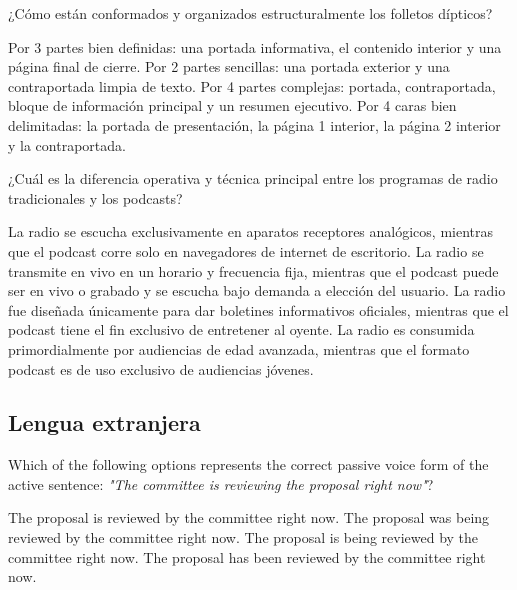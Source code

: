\documentclass[12pt]{evaluasep}
\begin{document}
\begin{questions}
    \question ¿Cómo están conformados y organizados estructuralmente los folletos dípticos?
    \begin{choices}
        \choice Por 3 partes bien definidas: una portada informativa, el contenido interior y una página final de cierre.
        \choice Por 2 partes sencillas: una portada exterior y una contraportada limpia de texto.
        \choice Por 4 partes complejas: portada, contraportada, bloque de información principal y un resumen ejecutivo.
        \CorrectChoice Por 4 caras bien delimitadas: la portada de presentación, la página 1 interior, la página 2 interior y la contraportada.
    \end{choices}
    \vspace{0.3cm}

    \question ¿Cuál es la diferencia operativa y técnica principal entre los programas de radio tradicionales y los podcasts?
    \begin{choices}
        \choice La radio se escucha exclusivamente en aparatos receptores analógicos, mientras que el podcast corre solo en navegadores de internet de escritorio.
        \CorrectChoice La radio se transmite en vivo en un horario y frecuencia fija, mientras que el podcast puede ser en vivo o grabado y se escucha bajo demanda a elección del usuario.
        \choice La radio fue diseñada únicamente para dar boletines informativos oficiales, mientras que el podcast tiene el fin exclusivo de entretener al oyente.
        \choice La radio es consumida primordialmente por audiencias de edad avanzada, mientras que el formato podcast es de uso exclusivo de audiencias jóvenes.
    \end{choices}
    				    \subsection{Lengua extranjera}

\question Which of the following options represents the correct passive voice form of the active sentence: \textit{"The committee is reviewing the proposal right now"}?
    \begin{choices}
        \choice The proposal is reviewed by the committee right now.
        \choice The proposal was being reviewed by the committee right now.
        \CorrectChoice The proposal is being reviewed by the committee right now.
        \choice The proposal has been reviewed by the committee right now.
    \end{choices}
    \vspace{0.3cm}


\end{questions}
\end{document}
